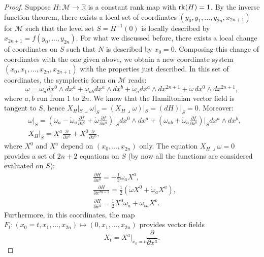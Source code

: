 \documentclass{article}
\numberwithin{equation}{section}
\theoremstyle{definition}
\newcommand{\R}{\mathbb{R}}
\newcommand{\M}{\mathcal{M}}
\newcommand{\inn}{\operatorname{\lrcorner}}
\newcommand{\pder}[2]{\frac{\partial #1}{\partial #2}}
\begin{document}
\begin{proof}
    Suppose $H:\M\to \R$ is a constant rank map with ${\rm rk}(H)=1$. By the inverse function theorem, there exists a local set of coordinates $(y_0,y_1,\dots,y_{2n},x_{2n+1})$ for $\M$ such that the level set $S=H^{-1}(0)$ is locally described by $x_{2n+1}=f(y_0,\dots,y_{2n})$. For what we discussed before, there exists a local change of coordinates on $S$ such that $N$ is described by $x_0=0$. Composing this change of coordinates with the one given above, we obtain a new coordinate system $(x_0,x_1,\dots,x_{2n},x_{2n+1})$ with the properties just described. In this set of coordinates, the symplectic form on $\M$ reads:
    \begin{equation}
        \omega=\omega_adx^0\wedge dx^a+\omega_{ab}dx^a\wedge dx^b+\mathring{\omega}_adx^a\wedge dx^{2n+1}+\mathring{\omega}\,dx^0\wedge dx^{2n+1},
    \end{equation}
    where $a,b$ run from $1$ to $2n$. We know that the Hamiltonian vector field is tangent to $S$, hence $X_H|_S\inn\omega|_S=(X_H\inn\omega)|_S=(dH)|_S=0$. Moreover:
    \begin{equation}
        \begin{split}
            &\omega|_S=\left(\omega_a-\mathring{\omega}_a\pder{f}{x^0}+\mathring{\omega}\pder{f}{x^a}\right)\bigg|_S dx^0\wedge dx^a+\left(\omega_{ab}+\mathring{\omega}_a\pder{f}{x^b}\right)\bigg|_Sdx^a\wedge dx^b,\\
        & X_H|_S=X^a\pder{}{x^a}+X^0\pder{}{x^0},
        \end{split}
    \end{equation}
    where $X^0$ and $X^a$ depend on $(x_0,\dots,x_{2n})$ only. The equation $X_H\inn\omega=0$ provides a set of $2n+2$ equations on $S$ (by now all the functions are considered evaluated on $S$):
    \begin{equation}
        \begin{split}
            &\pder{H}{x^0}=-\frac{1}{2}\omega_aX^a,\\
        &\pder{H}{x^{2n+1}}=\frac{1}{2}(\mathring{\omega}X^0+\mathring{\omega}_aX^a),\\
        &\pder{H}{x^a}=\frac{1}{2}X^0\omega_a+\omega_{ba}X^b.
        \end{split}
    \end{equation}
    Furthermore, in this coordinates, the map $F_t:(x_0=t,x_1,\dots,x_{2n})\mapsto(0,x_1,\dots,x_{2n})$ provides vector fields
    \begin{equation}
        X_t=X^a|_{x_0=t}\pder{}{x^a}.

\end{equation}
\end{proof}
\end{document}
